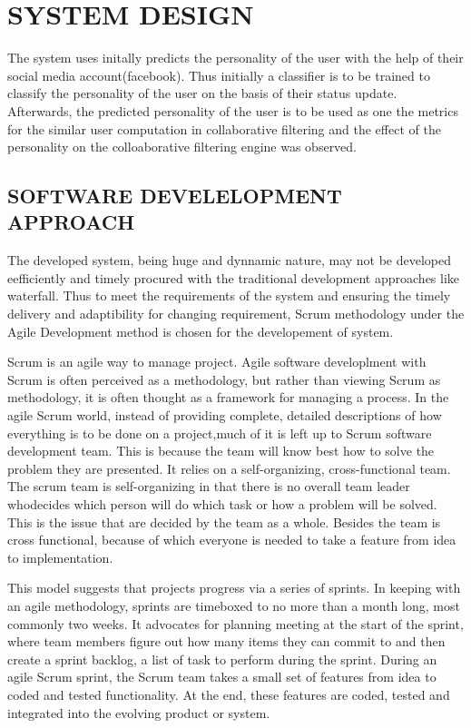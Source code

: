 \newpage
\section{SYSTEM DESIGN}

The system uses initally predicts the personality of the user with the help of their social media account(facebook). Thus initially a classifier is to be trained to classify the personality of the user on the basis of their status update. Afterwards, the predicted personality of the user is to be used as one the metrics for the similar user computation in collaborative filtering and the effect of the personality on the colloaborative filtering engine was observed.
\subsection{SOFTWARE DEVELELOPMENT APPROACH}
The developed system, being huge and dynnamic nature, may not be developed eefficiently and timely procured with the traditional development approaches like waterfall. Thus to meet the requirements of the system and ensuring the timely delivery and adaptibility for changing requirement, Scrum methodology under the Agile Development method is chosen for the developement of system.

Scrum is an agile way to manage project. Agile software developlment with Scrum is often perceived as a methodology, but rather than viewing Scrum as methodology, it is often thought as a framework for managing a process. In the agile Scrum world, instead of providing complete, detailed descriptions of how everything is to be done on a project,much of it is left up to Scrum software development team. This is because the team will know best how to solve the problem they are presented. It relies on a self-organizing, cross-functional team. The scrum team is self-organizing in that there is no overall team leader whodecides which person will do which task or how a problem will be solved. This is the issue that are decided by the team as a whole. Besides the team is cross functional, because of which everyone is needed to take a feature from idea to implementation. 

This model suggests that projects progress via a series of sprints. In keeping with an agile methodology, sprints are timeboxed to no more than a month long, most commonly two weeks. It advocates for planning meeting at the start of the sprint, where team members figure out how many items they can commit to and then create a sprint backlog, a list of task to perform during the sprint. During an agile Scrum sprint, the Scrum team takes a small set of features from idea to coded and tested functionality. At the end, these features are coded, tested and integrated into the evolving product or system.

